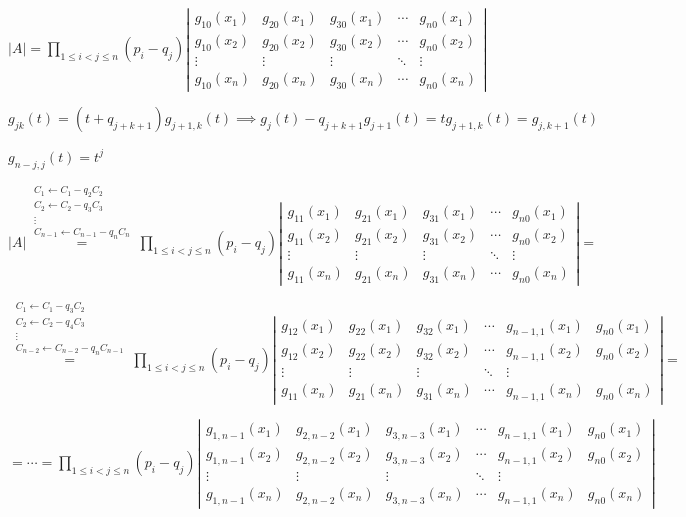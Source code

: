 \documentclass{article}
\begin{document}
\( |A| = \prod_{1 \leq i < j \leq n} (p_i - q_j) \left|\begin{matrix}g_{10}(x_1) & g_{20}(x_1) & g_{30}(x_1) & \cdots & g_{n0}(x_1) \\ g_{10}(x_2) & g_{20}(x_2) & g_{30}(x_2) & \cdots & g_{n0}(x_2) \\ \vdots & \vdots & \vdots & \ddots & \vdots \\ g_{10}(x_n) & g_{20}(x_n) & g_{30}(x_n) & \cdots & g_{n0}(x_n) \end{matrix}\right| \)

\( g_{jk}(t) = (t + q_{j+k+1})g_{j+1,k}(t) \implies g_j(t) - q_{j+k+1}g_{j+1}(t) = tg_{j+1,k}(t) = g_{j, k + 1}(t) \)

\( g_{n-j,j}(t) = t^{j} \)

\( |A| \overset{\substack{C_{1} \leftarrow C_{1} - q_{2}C_{2} \\ C_{2} \leftarrow C_{2} - q_{3}C_{3} \\ \vdots \\ C_{n-1} \leftarrow C_{n-1} - q_{n}C_{n} }}{=} \prod_{1 \leq i < j \leq n} (p_i - q_j) \left|\begin{matrix}g_{11}(x_1) & g_{21}(x_1) & g_{31}(x_1) & \cdots & g_{n0}(x_1) \\ g_{11}(x_2) & g_{21}(x_2) & g_{31}(x_2) & \cdots & g_{n0}(x_2) \\ \vdots & \vdots & \vdots & \ddots & \vdots \\ g_{11}(x_n) & g_{21}(x_n) & g_{31}(x_n) & \cdots & g_{n0}(x_n) \end{matrix}\right| = \)

\( \overset{\substack{C_{1} \leftarrow C_{1} - q_{3}C_{2} \\ C_{2} \leftarrow C_{2} - q_{4}C_{3} \\ \vdots \\ C_{n-2} \leftarrow C_{n-2} - q_{n}C_{n-1} }}{=} \prod_{1 \leq i < j \leq n} (p_i - q_j) \left|\begin{matrix}g_{12}(x_1) & g_{22}(x_1) & g_{32}(x_1) & \cdots & g_{n-1,1}(x_1) & g_{n0}(x_1) \\ g_{12}(x_2) & g_{22}(x_2) & g_{32}(x_2) & \cdots & g_{n-1,1}(x_2) & g_{n0}(x_2) \\ \vdots & \vdots & \vdots & \ddots & \vdots \\ g_{11}(x_n) & g_{21}(x_n) & g_{31}(x_n) & \cdots & g_{n-1,1}(x_n) & g_{n0}(x_n) \end{matrix}\right| = \)

\( = \cdots = \prod_{1 \leq i < j \leq n} (p_i - q_j) \left|\begin{matrix}g_{1,n-1}(x_1) & g_{2,n-2}(x_1) & g_{3,n-3}(x_1) & \cdots & g_{n-1,1}(x_1) & g_{n0}(x_1) \\ g_{1,n-1}(x_2) & g_{2,n-2}(x_2) & g_{3,n-3}(x_2) & \cdots & g_{n-1,1}(x_2) & g_{n0}(x_2) \\ \vdots & \vdots & \vdots & \ddots & \vdots \\ g_{1,n-1}(x_n) & g_{2,n-2}(x_n) & g_{3,n-3}(x_n) & \cdots & g_{n-1,1}(x_n) & g_{n0}(x_n) \end{matrix}\right| \)
\end{document}
